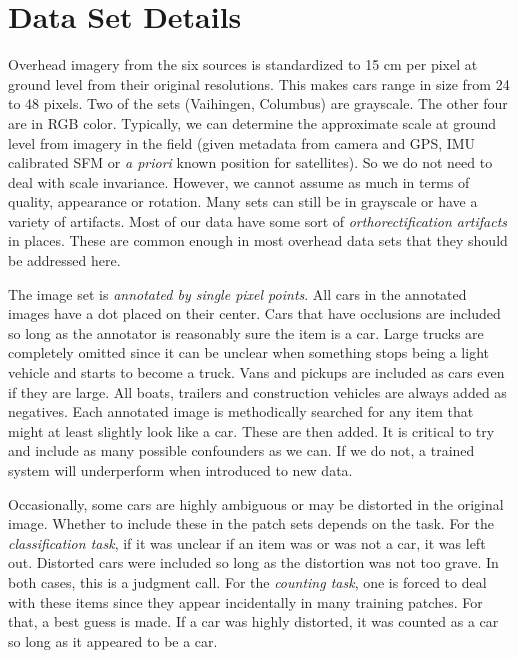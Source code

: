 \documentclass[runningheads]{llncs}
\begin{document}
\section{Data Set Details}
Overhead imagery from the six sources is standardized to 15 cm per pixel at ground level from their original resolutions. This makes cars range in size from 24 to 48 pixels. Two of the sets (Vaihingen, Columbus) are grayscale. The other four are in RGB color. Typically, we can determine the approximate scale at ground level from imagery in the field (given metadata from camera and GPS, IMU calibrated SFM \cite{Kelly09} or {\it a priori} known position for satellites). So we do not need to deal with scale invariance. However, we cannot assume as much in terms of quality, appearance or rotation. Many sets can still be in grayscale or have a variety of artifacts. Most of our data have some sort of {\it orthorectification artifacts} in places. These are common enough in most overhead data sets that they should be addressed here.

The image set is {\it annotated by single pixel points}. All cars in the annotated images have a dot placed on their center. Cars that have occlusions are included so long as the annotator is reasonably sure the item is a car. Large trucks are completely omitted since it can be unclear when something stops being a light vehicle and starts to become a truck. Vans and pickups are included as cars even if they are large. All boats, trailers and construction vehicles are always added as negatives. Each annotated image is methodically searched for any item that might at least slightly look like a car. These are then added. It is critical to try and include as many possible confounders as we can.  If we do not, a trained system will underperform when introduced to new data. 

Occasionally, some cars are highly ambiguous or may be distorted in the original image. Whether to include these in the patch sets depends on the task. For the {\it classification task}, if it was unclear if an item was or was not a car, it was left out. Distorted cars were included so long as the distortion was not too grave. In both cases, this is a judgment call. For the {\it counting task}, one is forced to deal with these items since they appear incidentally in many training patches. For that, a best guess is made. If a car was highly distorted, it was counted as a car so long as it appeared to be a car. 
\end{document}
